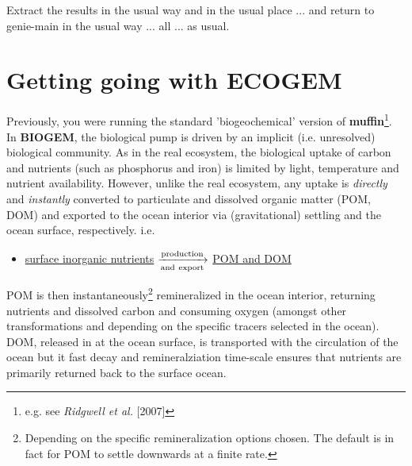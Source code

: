 \documentclass[11pt,fleqn]{book} %
\begin{document}
\noindent Extract the results in the usual way and in the usual place ... and return to \textsf{\footnotesize genie-main} in the usual way ... all ... as usual.


\newpage


\section{Getting going with ECOGEM}

Previously, you were running the standard 'biogeochemical' version of \textbf{muffin}\footnote{e.g. see \textit{Ridgwell et al.} [2007]}.  In \textbf{BIOGEM}, the biological pump is driven by an implicit (i.e. unresolved) biological community. As in the real ecosystem, the biological uptake of carbon and nutrients (such as phosphorus and iron) is limited by light, temperature and nutrient availability. However, unlike the real ecosystem, any uptake is \textit{directly} and \textit{instantly} converted to particulate and dissolved organic matter (POM, DOM) and exported to the ocean interior via (gravitational) settling and the ocean surface, respectively. i.e.
\vspace{4mm}
\begin{itemize}
\item \underline{surface inorganic nutrients} $\xrightarrow[\rm and~export]{\rm production}$ \underline{POM and DOM}
\end{itemize}
\vspace{4mm}
POM is then instantaneously\footnote{Depending on the specific remineralization options chosen. The default is in fact for POM to settle downwards at a finite rate.} remineralized in the ocean interior, returning nutrients and dissolved carbon and consuming oxygen (amongst other transformations and depending on the specific tracers selected in the ocean). DOM, released in at the ocean surface, is transported with the circulation of the ocean but it fast decay and remineralziation time-scale ensures that nutrients are primarily returned  back to the surface ocean.
\end{document}
